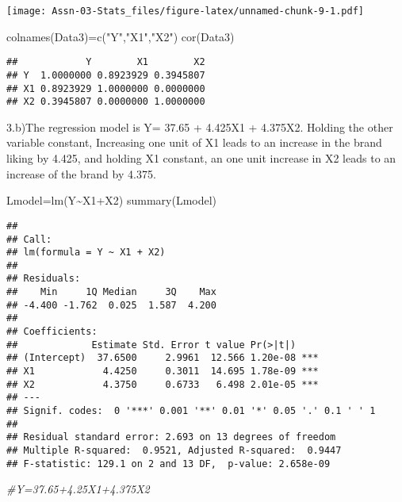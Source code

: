 \documentclass[
]{article}
\newenvironment{Shaded}{\begin{snugshade}}{\end{snugshade}}
\newcommand{\CommentTok}[1]{\textcolor[rgb]{0.56,0.35,0.01}{\textit{#1}}}
\newcommand{\FunctionTok}[1]{\textcolor[rgb]{0.00,0.00,0.00}{#1}}
\newcommand{\NormalTok}[1]{#1}
\newcommand{\OtherTok}[1]{\textcolor[rgb]{0.56,0.35,0.01}{#1}}
\newcommand{\SpecialCharTok}[1]{\textcolor[rgb]{0.00,0.00,0.00}{#1}}
\newcommand{\StringTok}[1]{\textcolor[rgb]{0.31,0.60,0.02}{#1}}
\begin{document}
\texttt{[image: Assn-03-Stats\_files/figure-latex/unnamed-chunk-9-1.pdf]}

\begin{Shaded}
\begin{Highlighting}[]
\FunctionTok{colnames}\NormalTok{(Data3)}\OtherTok{=}\FunctionTok{c}\NormalTok{(}\StringTok{"Y"}\NormalTok{,}\StringTok{"X1"}\NormalTok{,}\StringTok{"X2"}\NormalTok{)}
\FunctionTok{cor}\NormalTok{(Data3)}
\end{Highlighting}
\end{Shaded}

\begin{verbatim}
##            Y        X1        X2
## Y  1.0000000 0.8923929 0.3945807
## X1 0.8923929 1.0000000 0.0000000
## X2 0.3945807 0.0000000 1.0000000
\end{verbatim}

3.b)The regression model is Y= 37.65 + 4.425X1 + 4.375X2. Holding the
other variable constant, Increasing one unit of X1 leads to an increase
in the brand liking by 4.425, and holding X1 constant, an one unit
increase in X2 leads to an increase of the brand by 4.375.

\begin{Shaded}
\begin{Highlighting}[]
\NormalTok{Lmodel}\OtherTok{=}\FunctionTok{lm}\NormalTok{(Y}\SpecialCharTok{\textasciitilde{}}\NormalTok{X1}\SpecialCharTok{+}\NormalTok{X2)}
\FunctionTok{summary}\NormalTok{(Lmodel)}
\end{Highlighting}
\end{Shaded}

\begin{verbatim}
## 
## Call:
## lm(formula = Y ~ X1 + X2)
## 
## Residuals:
##    Min     1Q Median     3Q    Max 
## -4.400 -1.762  0.025  1.587  4.200 
## 
## Coefficients:
##             Estimate Std. Error t value Pr(>|t|)    
## (Intercept)  37.6500     2.9961  12.566 1.20e-08 ***
## X1            4.4250     0.3011  14.695 1.78e-09 ***
## X2            4.3750     0.6733   6.498 2.01e-05 ***
## ---
## Signif. codes:  0 '***' 0.001 '**' 0.01 '*' 0.05 '.' 0.1 ' ' 1
## 
## Residual standard error: 2.693 on 13 degrees of freedom
## Multiple R-squared:  0.9521, Adjusted R-squared:  0.9447 
## F-statistic: 129.1 on 2 and 13 DF,  p-value: 2.658e-09
\end{verbatim}

\begin{Shaded}
\begin{Highlighting}[]
\CommentTok{\#Y=37.65+4.25X1+4.375X2}
\end{Highlighting}
\end{Shaded}
\end{document}
